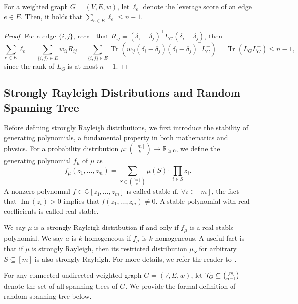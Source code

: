 \documentclass[11pt]{article}
\newcommand{\paren}[1]{\left( #1 \right)}
\newcommand{\parens}[1]{( #1 )}
\newcommand{\sqb}[1]{\left[ #1 \right]}
\newcommand{\sets}[1]{\{ #1 \}}
\newcommand{\CC}{\mathbb{C}} \newcommand{\RR}{\mathbb{R}} \renewcommand{\natural}{\mathbb{N}} \renewcommand{\Re}{\operatorname{Re}} \renewcommand{\Im}{\operatorname{Im}} \newcommand{\diag}{\operatorname{diag}} \newcommand{\supp}{\operatorname{supp}} \newcommand{\iso}{\operatorname{iso}} \newcommand{\KL}{\operatorname{KL}} \newcommand{\TV}{\operatorname{TV}} \newcommand{\mix}{\operatorname{mix}} \newcommand{\trace}{\operatorname{Tr}}
\begin{document}
{\begin{lemma}\label{le:Foster}
  For a weighted graph $G=\parens{V,E,w}$, let $\ell_{e}$ denote the leverage score of an edge $e\in E$.
  Then, it holds that $\sum_{e \in E} \ell_e \leq n - 1$.
\end{lemma}
\begin{proof}For a edge $\sets{i,j}$, recall that
  $R_{ij}=\paren{\delta_i -\delta_j}^\top L_G^{+}\paren{\delta_i -\delta_j}$,
  then
  \begin{equation*}
  \sum_{e \in E} \ell_e =\sum_{\sets{i,j} \in E} w_{ij} R_{ij} =\sum_{\sets{{i,j}}\in E} \trace \paren{w_{ij}\paren{\delta_i -\delta_j}\paren{\delta_i -\delta_j}^\top L_G^{+}}=\trace\paren{L_G L_G^{+}}\leq n-1,
  \end{equation*}
  since the rank of $L_G$ is at most $n-1$.
\end{proof}

\subsection{Strongly Rayleigh Distributions and Random Spanning Tree}
Before defining strongly Rayleigh distributions, we first introduce the stability of generating polynomials, a fundamental property in both mathematics and physics. 
For a probability distribution $\mu:\binom{\sqb{m}}{k}\to \RR_{\geq 0}$, we define the generating polynomial $f_{\mu}$ of $\mu$ as
\begin{equation*}
	f _{\mu}\parens{z_1,\ldots, z_m}= \sum_{S \in \binom{\sqb{m}}{k} }\mu\parens{S}\cdot \prod_{i \in S}z_i .
\end{equation*}
A nonzero polynomial $f\in\CC\sqb{z_1,\ldots,z_m}$ is called stable if, $\forall i \in \sqb{m}$, the fact that $\Im\parens{z_i}>0$ implies that $f \paren{z_1,\ldots,z_m}\neq 0$. A stable polynomial with real coefficients is called real stable.

We say $\mu$ is a strongly Rayleigh distribution if and only if $f_{\mu}$ is a real stable polynomial. We say $\mu$ is $k$-homogeneous if $f_{\mu}$ is $k$-homogeneous.
A useful fact is that if $\mu$ is strongly Rayleigh, then its restricted distribution $\mu _S$ 
for arbitrary $S\subseteq \sqb{m}$ is also strongly Rayleigh. For more details, we refer the reader to~\cite{borcea2009negative}.

For any connected undirected weighted graph $G=\parens{V,E,w}$, let $\cT_G \subseteq \binom{\sqb{m}}{n-1}$ denote the set of all spanning trees of $G$. We provide the formal definition of random spanning tree below.

}
\end{document}
